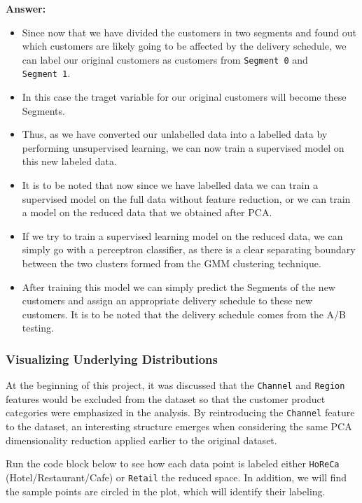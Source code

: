 \documentclass[11pt]{article}
\providecommand{\tightlist}{%
      \setlength{\itemsep}{0pt}\setlength{\parskip}{0pt}}
\begin{document}
    \textbf{Answer:}

\begin{itemize}
\tightlist
\item
  Since now that we have divided the customers in two segments and found
  out which customers are likely going to be affected by the delivery
  schedule, we can label our original customers as customers from
  \texttt{Segment\ 0} and \texttt{Segment\ 1}.
\item
  In this case the traget variable for our original customers will
  become these Segments.
\item
  Thus, as we have converted our unlabelled data into a labelled data by
  performing unsupervised learning, we can now train a supervised model
  on this new labeled data.
\item
  It is to be noted that now since we have labelled data we can train a
  supervised model on the full data without feature reduction, or we can
  train a model on the reduced data that we obtained after PCA.
\item
  If we try to train a supervised learning model on the reduced data, we
  can simply go with a perceptron classifier, as there is a clear
  separating boundary between the two clusters formed from the GMM
  clustering technique.
\item
  After training this model we can simply predict the Segments of the
  new customers and assign an appropriate delivery schedule to these new
  customers. It is to be noted that the delivery schedule comes from the
  A/B testing.
\end{itemize}

    \subsubsection{Visualizing Underlying
Distributions}\label{visualizing-underlying-distributions}

At the beginning of this project, it was discussed that the
\texttt{\textquotesingle{}Channel\textquotesingle{}} and
\texttt{\textquotesingle{}Region\textquotesingle{}} features would be
excluded from the dataset so that the customer product categories were
emphasized in the analysis. By reintroducing the
\texttt{\textquotesingle{}Channel\textquotesingle{}} feature to the
dataset, an interesting structure emerges when considering the same PCA
dimensionality reduction applied earlier to the original dataset.

Run the code block below to see how each data point is labeled either
\texttt{\textquotesingle{}HoReCa\textquotesingle{}}
(Hotel/Restaurant/Cafe) or
\texttt{\textquotesingle{}Retail\textquotesingle{}} the reduced space.
In addition, we will find the sample points are circled in the plot,
which will identify their labeling.
\end{document}
